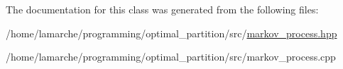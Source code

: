 The documentation for this class was generated from the following files\-:\begin{DoxyCompactItemize}
\item 
/home/lamarche/programming/optimal\-\_\-partition/src/\hyperlink{markov__process_8hpp}{markov\-\_\-process.\-hpp}\item 
/home/lamarche/programming/optimal\-\_\-partition/src/markov\-\_\-process.\-cpp\end{DoxyCompactItemize}

